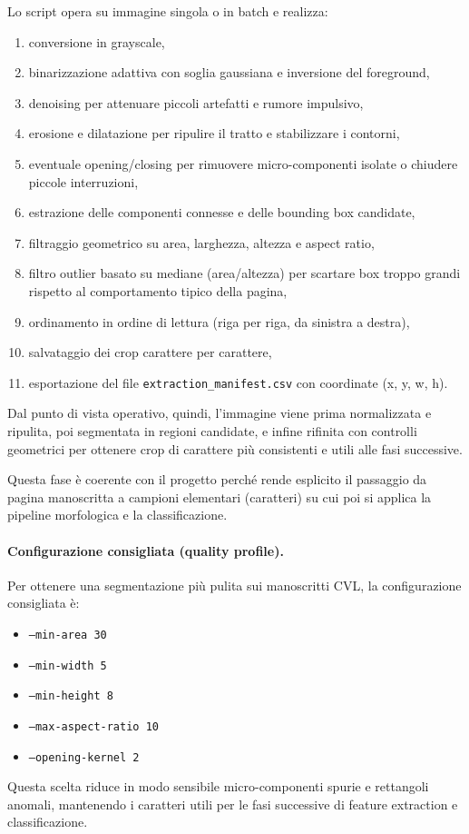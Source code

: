 \documentclass[a4paper,12pt]{article}
\begin{document}
Lo script opera su immagine singola o in batch e realizza:
\begin{enumerate}[leftmargin=1.5em]
  \item conversione in grayscale,
  \item binarizzazione adattiva con soglia gaussiana e inversione del foreground,
  \item denoising per attenuare piccoli artefatti e rumore impulsivo,
  \item erosione e dilatazione per ripulire il tratto e stabilizzare i contorni,
  \item eventuale opening/closing per rimuovere micro-componenti isolate o chiudere piccole interruzioni,
  \item estrazione delle componenti connesse e delle bounding box candidate,
  \item filtraggio geometrico su area, larghezza, altezza e aspect ratio,
  \item filtro outlier basato su mediane (area/altezza) per scartare box troppo grandi rispetto al comportamento tipico della pagina,
  \item ordinamento in ordine di lettura (riga per riga, da sinistra a destra),
  \item salvataggio dei crop carattere per carattere,
  \item esportazione del file \texttt{extraction\_manifest.csv} con coordinate (x, y, w, h).
\end{enumerate}

Dal punto di vista operativo, quindi, l'immagine viene prima normalizzata e ripulita, poi segmentata in regioni candidate, e infine rifinita con controlli geometrici per ottenere crop di carattere più consistenti e utili alle fasi successive.

Questa fase è coerente con il progetto perché rende esplicito il passaggio da pagina manoscritta a campioni elementari (caratteri) su cui poi si applica la pipeline morfologica e la classificazione.

\paragraph{Configurazione consigliata (quality profile).}
Per ottenere una segmentazione più pulita sui manoscritti CVL, la configurazione consigliata è:
\begin{itemize}[leftmargin=1.5em]
  \item \texttt{--min-area 30}
  \item \texttt{--min-width 5}
  \item \texttt{--min-height 8}
  \item \texttt{--max-aspect-ratio 10}
  \item \texttt{--opening-kernel 2}
\end{itemize}
Questa scelta riduce in modo sensibile micro-componenti spurie e rettangoli anomali, mantenendo i caratteri utili per le fasi successive di feature extraction e classificazione.
\end{document}
